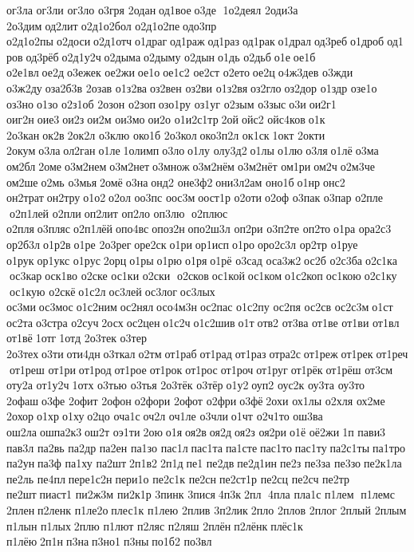 ог3ла  
ог3ли  
ог3ло  	о3гря 	2одан од1вое о3де  1о2деял 
2оди3а 
2о3дим од2лит о2д1о2бол 
о2д1о2пе одо3пр 
о2д1о2пы о2доси о2д1отч о1драг од1раж од1раз од1рак о1драл од3реб о1дроб од1ров од3рёб о2д1у2ч о2дыма о2дыму 	о2дын о1дь 	о2дьб о1е ое1б 
о2е1вл ое2д о3ежек 	ое2жи ое1о ое1с2 	ое2ст 	о2ето ое2ц о4ж3дев 	о3жди 
о3ж2ду оза2б3в 	2озав 
о1з2ва оз2вен 	оз2ви 
о1з2вя оз2гло оз2дор 	о1здр 	озе1о 	оз3но о1зо 
о2з1об 	2озон 	о2зоп озо1ру 	оз1уг 	о2зым 	о3зыс о3и ои2г1 	оиг2н оие3 ои2з ои2м 	ои3мо ои2о 
о1и2с1тр 2ой ойс2 
ойс4ков о1к 
2о3кан ок2в 2ок2л 	о3клю 	око1б 
2о3кол око3п2л 	ок1ск 1окт 	2окти 	2окум о3ла ол2ган о1ле 1олимп о3ло о1лу 
олу3д2 о1лы о1лю о3ля о1лё о3ма 	ом2бл 2оме о3м2нем о3м2нет о3множ о3м2нём о3м2нёт 	ом1ри ом2ч о2м3че  	ом2ше о2мь 	о3мья 2омё о3на онд2 
оне3ф2 они3л2ам 	оно1б о1нр онс2 
он2трат он2тру о1о2 о2ол 	оо3пс 	оос3м оост1р 	о2оти о2оф 	о3пак 	о3пар 
о2пле  о2п1лей 	о2пли оп2лит 	оп2ло 
оп3лю  о2плюс 	о2пля о3пляс о2п1лёй опо4вс опоз2н опо2ш3л 	оп2ри 
о3п2те 	оп2то о1ра 
ора2с3 
ор2б3л о1р2в о1ре 
2о3рег оре2ск о1ри ор1исп о1ро оро2с3л 	ор2тр 	о1руе 	о1рук ор1укс 	о1рус 2орц о1ры о1рю о1ря о1рё 	о3сад 
оса3ж2 ос2б 
о2с3ба о2с1ка  ос3кар оск1во 	о2ске 	ос1ки 
о2ски  о2сков ос1кой ос1ком о1с2коп ос1кою о2с1ку  ос1кую 	о2скё о1с2л ос3лей ос3лог ос3лых 	ос3ми ос3мос о1с2ним ос2нял осо4м3н ос2пас 
о1с2пу 	ос2пя 	ос2св 
ос2с3м о1ст 	ос2та о3стра 	о2суч 2осх ос2цен о1с2ч о1с2шив о1т отв2 	от3ва 	от1ве 	от1ви 	от1вл 	от1вё 1отг 1отд 
2о3тек 	о3тер 
2о3тех о3ти оти4дн о3ткал о2тм от1раб от1рад от1раз отра2с от1реж от1рек от1реч от1реш 	от1ри от1род от1рое от1рок от1рос от1роч от1руг от1рёк от1рёш 	от3см 	оту2а 
от1у2ч 1отх 	о3тью 	о3тья 
2о3тёк 	о3тёр о1у2 оуп2 	оус2к 	оу3та 	оу3то 	2офаш о3фе 	2офит 	2офон о2фори 	2офот 	о2фри о3фё 2охи 	ох1лы 	о2хля 	ох2ме 	2охор о1хр о1ху о2цо 	оча1с оч2л 	оч1ле 	о3чли о1чт 
о2ч1то 	ош3ва 	ош2ла ошпа2к3 ош2т 	оэ1ти 2ою о1я оя2в оя2д оя2з 	оя2ри о1ё 	оё2жи 1п 	пави3 	пав3л 	па2вь 	па2др 	па2ен 	па1зо 	пас1л пас1та па1сте пас1то пас1ту па2с1ты па1тро 	па2ун па3ф 	па1ху 	па2шт 2п1в2 2п1д пе1 	пе2дв пе2д1ин пе2з 	пе3за 	пе3зо пе2к1ла 	пе2ль 	пе4пл пере1с2н пери1о 
пе2с1к 	пе2сн пе2ст1р 	пе2сц 	пе2сч 	пе2тр 	пе2шт пиаст1 
пи2ж3м 
пи2к1р 	3пинк 	3пися 4п3к 2пл  4пла  	пла1с 
п1лем  п1лемс 	2плен п2ленк 
п1ле2о плес1к 	п1лею 	2плив 
3п2лик 2пло  	2плов 	2плог 	2плый 	2плым 	п1лын 	п1лых 2плю  	п1лют 	п2ляс 	п2ляш 	2плён п2лёнк плёс1к 	п1лёю 2п1н п3на п3но1 п3ны по1б2 	по3вл 
